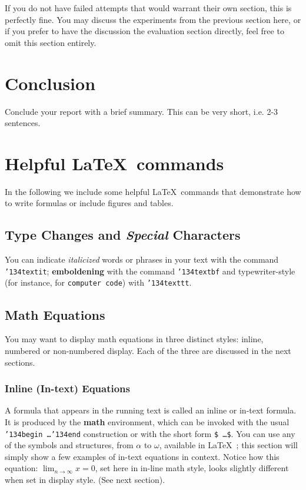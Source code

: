 If you do not have failed attempts that would warrant their own section, this is perfectly fine. You may discuss the experiments from the previous section here, or if you prefer to have the discussion the evaluation section directly, feel free to omit this section entirely.

\section{Conclusion}
Conclude your report with a brief summary. This can be very short, i.e. 2-3 sentences.

\section{Helpful \LaTeX~commands}
In the following we include some helpful \LaTeX~commands that demonstrate how to write formulas or include figures and tables.

\subsection{Type Changes and {\itshape Special} Characters}

You can indicate \textit{italicized} words or phrases in your text with the command
\texttt{{\char'134}textit}; \textbf{emboldening} with the command
\texttt{{\char'134}textbf} and typewriter-style (for instance, for \texttt{computer code}) with \texttt{{\char'134}texttt}.

\subsection{Math Equations}
You may want to display math equations in three distinct styles:
inline, numbered or non-numbered display.  Each of
the three are discussed in the next sections.

\subsubsection{Inline (In-text) Equations}
A formula that appears in the running text is called an inline or in-text formula.  It is produced by the \textbf{math} environment, which can be
invoked with the usual \texttt{{\char'134}begin\,\ldots{\char'134}end}
construction or with the short form \texttt{\$\,\ldots\$}. You
can use any of the symbols and structures,
from $\alpha$ to $\omega$, available in
\LaTeX~\cite{Lamport:LaTeX}; this section will simply show a
few examples of in-text equations in context. Notice how
this equation:
\begin{math}
  \lim_{n\rightarrow \infty}x=0
\end{math},
set here in in-line math style, looks slightly different when
set in display style.  (See next section).

